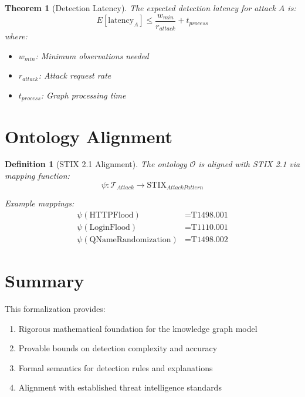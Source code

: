 \documentclass[11pt]{article}
\newtheorem{definition}{Definition}
\newtheorem{theorem}{Theorem}
\begin{document}
\begin{theorem}[Detection Latency]
The expected detection latency for attack $A$ is:
\begin{equation}
    E[\text{latency}_A] \leq \frac{w_{min}}{r_{attack}} + t_{process}
\end{equation}
where:
\begin{itemize}
    \item $w_{min}$: Minimum observations needed
    \item $r_{attack}$: Attack request rate
    \item $t_{process}$: Graph processing time
\end{itemize}
\end{theorem}

\section{Ontology Alignment}

\begin{definition}[STIX 2.1 Alignment]
The ontology $\mathcal{O}$ is aligned with STIX 2.1 via mapping function:
\begin{equation}
    \psi: \mathcal{T}_{Attack} \rightarrow \text{STIX}_{AttackPattern}
\end{equation}

Example mappings:
\begin{align}
    \psi(\text{HTTPFlood}) &= \text{T1498.001} \\
    \psi(\text{LoginFlood}) &= \text{T1110.001} \\
    \psi(\text{QNameRandomization}) &= \text{T1498.002}
\end{align}
\end{definition}

\section{Summary}

This formalization provides:
\begin{enumerate}
    \item Rigorous mathematical foundation for the knowledge graph model
    \item Provable bounds on detection complexity and accuracy
    \item Formal semantics for detection rules and explanations
    \item Alignment with established threat intelligence standards
\end{enumerate}
\end{document}
